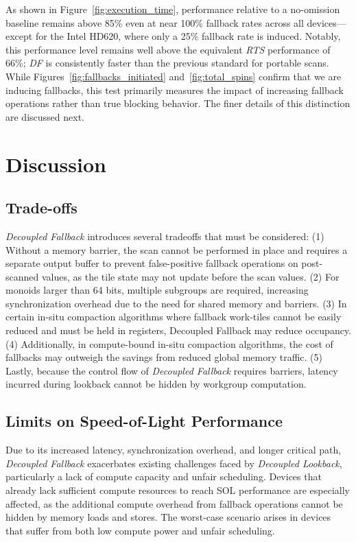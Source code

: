 \documentclass[acmsmall, manuscript, screen, review, anonymous]{acmart}
\begin{document}
As shown in Figure~\ref{fig:execution_time}, performance relative to a no-omission baseline remains above 85\% even at near 100\% fallback rates across all devices---except for the Intel HD620, where only a 25\% fallback rate is induced. Notably, this performance level remains well above the equivalent \emph{RTS} performance of 66\%; \emph{DF} is consistently faster than the previous standard for portable scans. While Figures~\ref{fig:fallbacks_initiated} and~\ref{fig:total_spins} confirm that we are inducing fallbacks, this test primarily measures the impact of increasing fallback operations rather than true blocking behavior. The finer details of this distinction are discussed next.
\section{Discussion}

\subsection{Trade-offs}
\emph{Decoupled Fallback} introduces several tradeoffs that must be considered: (1) Without a memory barrier, the scan cannot be performed in place and requires a separate output buffer to prevent false-positive fallback operations on post-scanned values, as the tile state may not update before the scan values. (2) For monoids larger than 64 bits, multiple subgroups are required, increasing synchronization overhead due to the need for shared memory and barriers. (3) In certain in-situ compaction algorithms where fallback work-tiles cannot be easily reduced and must be held in registers, Decoupled Fallback may reduce occupancy. (4) Additionally, in compute-bound in-situ compaction algorithms, the cost of fallbacks may outweigh the savings from reduced global memory traffic. (5) Lastly, because the control flow of \emph{Decoupled Fallback} requires barriers, latency incurred during lookback cannot be hidden by workgroup computation.

\subsection{Limits on Speed-of-Light Performance}
Due to its increased latency, synchronization overhead, and longer critical path, \emph{Decoupled Fallback} exacerbates existing challenges faced by \emph{Decoupled Lookback}, particularly a lack of compute capacity and unfair scheduling. Devices that already lack sufficient compute resources to reach SOL performance are especially affected, as the additional compute overhead from fallback operations cannot be hidden by memory loads and stores. The worst-case scenario arises in devices that suffer from both low compute power and unfair scheduling.
\end{document}
